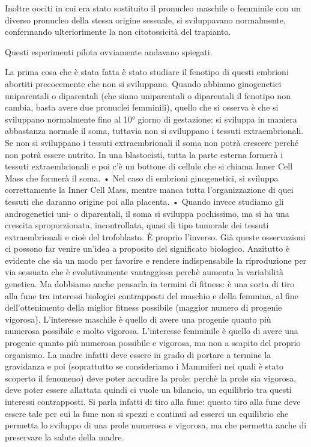 \documentclass[11pt]{book}
\begin{document}
Inoltre oociti in cui era stato sostituito il pronucleo maschile o femminile con un diverso pronucleo della stessa origine sessuale, si sviluppavano normalmente, confermando ulteriorimente la non citotossicità del trapianto.

Questi esperimenti pilota ovviamente andavano spiegati. 


















La prima cosa che è stata fatta è stato studiare il fenotipo di questi embrioni abortiti precocemente che non si sviluppano.
Quando abbiamo ginogenetici uniparentali o diparentali (che siano uniparentali o diparentali il fenotipo non cambia, basta avere due pronuclei femminili), quello che si osserva è che si sviluppano normalmente fino al 10° giorno di gestazione: si sviluppa in maniera abbastanza normale il soma, tuttavia non si sviluppano i tessuti extraembrionali. Se non si sviluppano i tessuti extraembrionali il soma non potrà crescere perché non potrà essere nutrito.
In una blastocisti, tutta la parte esterna formerà i tessuti extraembrionali e poi c’è un bottone di cellule che si chiama Inner Cell Mass che formerà il soma. 
    • Nel caso di embrioni ginogenetici, si sviluppa correttamente la Inner Cell Mass, mentre manca tutta l’organizzazione di quei tessuti che daranno origine poi alla placenta.
    • Quando invece studiamo gli androgenetici uni- o diparentali, il soma si sviluppa pochissimo, ma si ha una crescita sproporzionata, incontrollata, quasi di tipo tumorale dei tessuti extraembrionali e cioè del trofoblasto. È proprio l’inverso.
Già queste osservazioni ci possono far venire un’idea a proposito del significato biologico. 
Anzitutto è evidente che sia un modo per favorire e rendere indispensabile la riproduzione per via sessuata che è evolutivamente vantaggiosa perchè aumenta la variabilità genetica. 
Ma dobbiamo anche pensarla in termini di fitness: è una sorta di tiro alla fune tra interessi biologici contrapposti del maschio e della femmina, al fine dell’ottenimento della miglior fitness possibile (maggior numero di progenie vigorosa). L’interesse maschile è quello di avere una progenie quanto più numerosa possibile e molto vigorosa. L’interesse femminile è quello di avere una progenie quanto più numerosa possibile e vigorosa, ma non a scapito del proprio organismo. La madre infatti deve essere in grado di portare a termine la gravidanza e poi (soprattutto se consideriamo i Mammiferi nei quali è stato scoperto il fenomeno) deve poter accudire la prole: perchè la prole sia vigorosa, deve poter essere allattata quindi ci vuole un bilancio, un equilibrio tra questi interessi contrapposti. Si parla infatti di tiro alla fune: questo tiro alla fune deve essere tale per cui la fune non si spezzi e continui ad esserci un equilibrio che permetta lo sviluppo di una prole numerosa e vigorosa, ma che permetta anche di preservare la salute della madre. 
\end{document}
